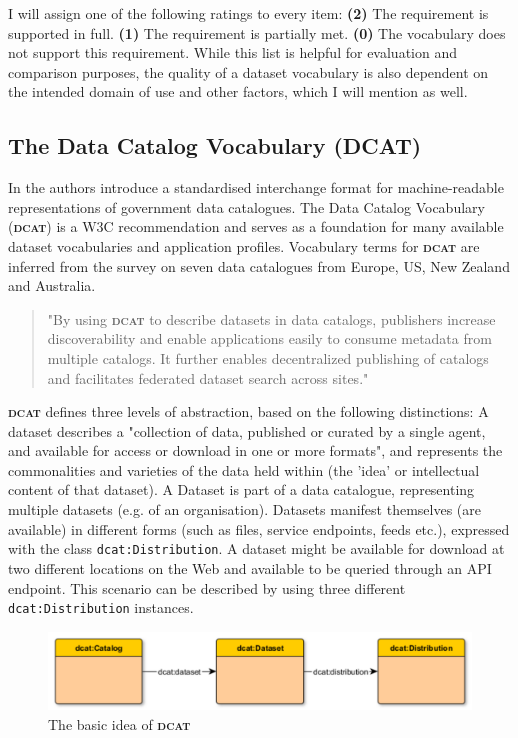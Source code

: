 \documentclass[a4paper,english,twoside,BCOR1.5cm,headsepline,DIV12,appendixprefix,final,12pt]{scrbook}
\newcommand{\dcat}{{\scshape\bfseries dcat}\xspace}
\newcommand{\prop}[1]{{{\texttt{#1}}}}
\begin{document}
I will assign one of the following ratings to every item: \textbf{(2)} The requirement is supported in full. \textbf{(1)} The requirement is partially met. \textbf{(0)} The vocabulary does not support this requirement. 
While this list is helpful for evaluation and comparison purposes, the quality of a dataset vocabulary is also dependent on the intended domain of use and other factors, which I will mention as well.

\subsection{The Data Catalog Vocabulary (DCAT)}
\label{sec:dcat}
In \cite{MaaliCP10} the authors introduce a standardised interchange format for machine-readable representations of government data catalogues. The Data Catalog Vocabulary (\dcat) is a W3C recommendation \cite{ddcat} and serves as a foundation for many available dataset vocabularies and application profiles.
Vocabulary terms for \dcat are inferred from the survey on seven data catalogues from Europe, US, New Zealand and Australia.

\begin{quote}
"By using \dcat to describe datasets in data catalogs, publishers increase discoverability and enable applications easily to consume metadata from multiple catalogs. It further enables decentralized publishing of catalogs and facilitates federated dataset search across sites." \cite{ddcat}
\end{quote}

\dcat defines three levels of abstraction, based on the following distinctions: A dataset describes a "collection of data, published or curated by a single agent, and available for access or download in one or more formats"\cite{ddcat}, and represents the commonalities and varieties of the data held within (the 'idea' or intellectual content of that dataset). A Dataset is part of a data catalogue, representing multiple datasets (e.g. of an organisation). Datasets manifest themselves (are available) in different forms (such as files, service endpoints, feeds etc.), expressed with the class \prop{dcat:Distribution}. A dataset might be available for download at two different locations on the Web and available to be queried through an API endpoint. This scenario can be described by using three different \prop{dcat:Distribution} instances.

\begin{figure}[!htbp]
\centering
  \includegraphics[width=\textwidth]{images/DcatIdea.png}
  \caption{The basic idea of \dcat}
  \label{fig:dcat}
\end{figure}
\end{document}
